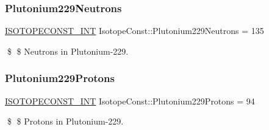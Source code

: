 \subsubsection{\texorpdfstring{Plutonium229\+Neutrons}{Plutonium229Neutrons}}
{\footnotesize\ttfamily \mbox{\hyperlink{group___isotope_const-_macros_ga5f18360b3e99483a35c32d789e62621c}{I\+S\+O\+T\+O\+P\+E\+C\+O\+N\+S\+T\+\_\+\+I\+NT}} Isotope\+Const\+::\+Plutonium229\+Neutrons = 135}

\$ \$ Neutrons in Plutonium-\/229. \mbox{\label{group___isotope_const-_plutonium-_pu229_gaa66d3d40e3fb1456d19cfd85df4cd3d7}} 
\subsubsection{\texorpdfstring{Plutonium229\+Protons}{Plutonium229Protons}}
{\footnotesize\ttfamily \mbox{\hyperlink{group___isotope_const-_macros_ga5f18360b3e99483a35c32d789e62621c}{I\+S\+O\+T\+O\+P\+E\+C\+O\+N\+S\+T\+\_\+\+I\+NT}} Isotope\+Const\+::\+Plutonium229\+Protons = 94}

\$ \$ Protons in Plutonium-\/229. 
